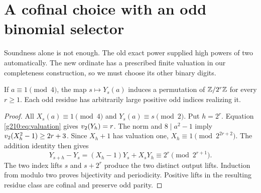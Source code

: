 \section{A cofinal choice with an odd binomial selector}\label{g210:sec:cofinal}

Soundness alone is not enough. The old exact power supplied high powers of
two automatically. The new ordinate has a prescribed finite valuation in our
completeness construction, so we must choose its other binary digits.

\begin{lemma}\label{g210:lem:permutation}
If $a\equiv1\pmod4$, the map $s\mapsto Y_s(a)$ induces a permutation of
$\mathbb Z/2^r\mathbb Z$ for every $r\ge1$. Each odd residue has arbitrarily large
positive odd indices realizing it.
\end{lemma}
\begin{proof}
All $X_s(a)\equiv1\pmod4$ and $Y_s(a)\equiv s\pmod2$. Put $h=2^r$.
Equation \eqref{g210:eq:valuation} gives $v_2(Y_h)=r$. The norm and
$8\mid a^2-1$ imply $v_2(X_h^2-1)\ge2r+3$. Since $X_h+1$ has valuation
one, $X_h\equiv1\pmod{2^{2r+2}}$. The addition identity then gives
\[
Y_{s+h}-Y_s=(X_h-1)Y_s+X_sY_h\equiv2^r\pmod{2^{r+1}}.
\]
The two index lifts $s$ and $s+2^r$ produce the two distinct output lifts.
Induction from modulo two proves bijectivity and periodicity. Positive lifts
in the resulting residue class are cofinal and preserve odd parity.
\end{proof}


